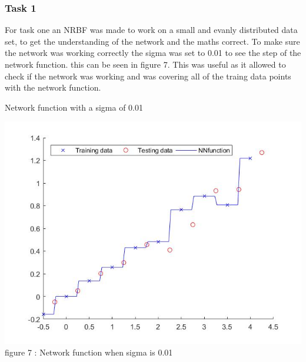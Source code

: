 \documentclass{IEEEtran}
\begin{document}
\subsubsection{Task 1}
\begin{flushleft}
 For task one an NRBF was made to work on a small and evanly distributed data set, to get the understanding of the network
 and the maths correct. To make sure the network was working correctly the sigma was set to 0.01 to see the step of the
 network function. this can be seen in figure 7. This was useful as it allowed to check if the network was working and
 was covering all of the traing data points with the network function.
 \vspace{1.5mm}
\\
\vspace{1.5mm}
\begin{center}
  Network function with a sigma of 0.01
\end{center}
\includegraphics[scale = 0.35]{NNstepfunction.jpg}
\vspace{1.5mm}
{\footnotesize figure 7 : Network function when sigma is 0.01 }
\\
\vspace{1.5mm}
\end{flushleft}
\end{document}
